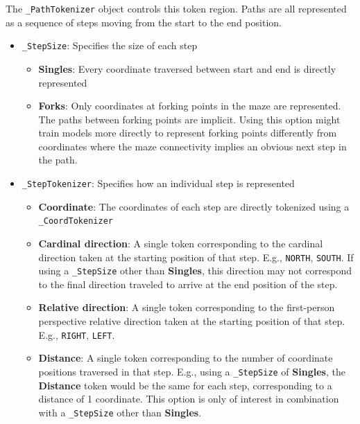 \documentclass[10pt,a4paper,onecolumn]{article}
\providecommand{\tightlist}{%
  \setlength{\itemsep}{0pt}\setlength{\parskip}{0pt}}
\begin{document}
The \texttt{\_PathTokenizer} object controls this token region. Paths
are all represented as a sequence of steps moving from the start to the
end position.

\begin{itemize}
\tightlist
\item
  \texttt{\_StepSize}: Specifies the size of each step

  \begin{itemize}
  \tightlist
  \item
    \textbf{Singles}: Every coordinate traversed between start and end
    is directly represented
  \item
    \textbf{Forks}: Only coordinates at forking points in the maze are
    represented. The paths between forking points are implicit. Using
    this option might train models more directly to represent forking
    points differently from coordinates where the maze connectivity
    implies an obvious next step in the path.
  \end{itemize}
\item
  \texttt{\_StepTokenizer}: Specifies how an individual step is
  represented

  \begin{itemize}
  \tightlist
  \item
    \textbf{Coordinate}: The coordinates of each step are directly
    tokenized using a \texttt{\_CoordTokenizer}
  \item
    \textbf{Cardinal direction}: A single token corresponding to the
    cardinal direction taken at the starting position of that step.
    E.g., \texttt{NORTH}, \texttt{SOUTH}. If using a \texttt{\_StepSize}
    other than \textbf{Singles}, this direction may not correspond to
    the final direction traveled to arrive at the end position of the
    step.
  \item
    \textbf{Relative direction}: A single token corresponding to the
    first-person perspective relative direction taken at the starting
    position of that step. E.g., \texttt{RIGHT}, \texttt{LEFT}.
  \item
    \textbf{Distance}: A single token corresponding to the number of
    coordinate positions traversed in that step. E.g., using a
    \texttt{\_StepSize} of \textbf{Singles}, the \textbf{Distance} token
    would be the same for each step, corresponding to a distance of 1
    coordinate. This option is only of interest in combination with a
    \texttt{\_StepSize} other than \textbf{Singles}.
  \end{itemize}
\end{itemize}
\end{document}
